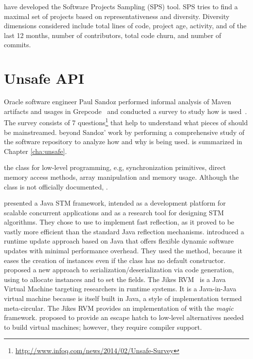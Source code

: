 \cite{nagappanDiversitySoftwareEngineering2013} have developed the Software Projects Sampling (SPS) tool.
SPS tries to find a maximal set of projects based on representativeness and diversity.
Diversity dimensions considered include total lines of code, project age, activity, and of the last 12 months, number of contributors, total code churn, and number of commits.


\section{Unsafe API}
\label{sec:lr:unsafe}

Oracle software engineer Paul Sandoz 
performed
informal analysis of Maven artifacts and usages in Grepcode~\cite{sandoz-personal-communication}
and conducted a survey to study how \unsafe{} is used~\cite{psandoz14}.
The survey consists of 7 questions\footnote{\url{http://www.infoq.com/news/2014/02/Unsafe-Survey}} 
that help to understand what pieces of \smu{} should be mainstreamed.
beyond Sandoz' work
by performing a comprehensive study of the \mavencentral{} software repository to analyze how and why \smu{} is being used.
 is summarized in Chapter \ref{cha:unsafe}.

 the \smu{} class for low-level programming, e.g, synchronization primitives, direct memory access methods, array manipulation and memory usage.
Although the \smu{} class is not officially documented,
.

\cite{korlandNoninvasiveConcurrencyJava2010} presented a Java STM framework, intended as a development platform for scalable concurrent applications and as a research tool for designing STM algorithms.
They chose to use \smu{} to implement fast reflection, as it proved to be vastly more efficient than the standard Java reflection mechanisms.
\cite{pukallFlexibleDynamicSoftware} introduced a runtime update approach based on Java that offers flexible dynamic software updates with minimal performance overhead.
They used the  method, because it eases the creation of instances even if the class has no default constructor.
\cite{gligoricCoDeSeFastDeserialization2011} proposed a new approach to serialization/deserialization via code generation, using \smu{} to allocate instances and to set the fields.
The Jikes RVM~\cite{alpernJikesResearchVirtual2005} is a Java Virtual Machine targeting researchers in runtime systems.
It is a Java-in-Java virtual machine because is itself built in Java, a style of implementation termed meta-circular.
The Jikes RVM provides an implementation of \smu{} with the \emph{magic} framework.
\cite{framptonDemystifyingMagicHighlevel2009} proposed  to provide an escape hatch to low-level alternatives needed to build virtual machines; however, they require compiler support.

